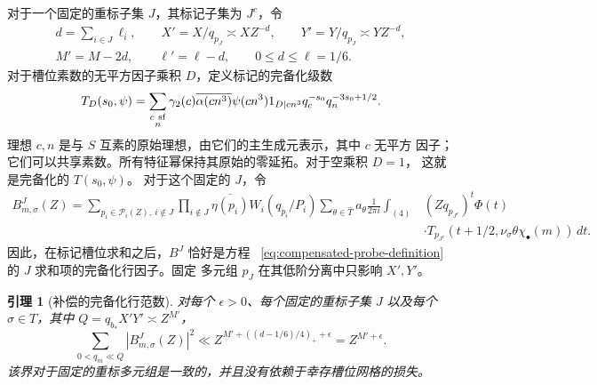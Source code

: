 \documentclass[11pt,a4paper]{article}
\numberwithin{equation}{section}
\numberwithin{figure}{section}
\newtheorem{lemma}[theorem]{引理}
\theoremstyle{definition}
\theoremstyle{remark}
\begin{document}
对于一个固定的重标子集 $J$，其标记子集为 $J^c$，令
\begin{equation}
 \begin{gathered}
 d=\sum_{i\in J}\ell_i,\qquad
 X'=X/q_{p_J}\asymp XZ^{-d},\qquad
 Y'=Y/q_{p_J}\asymp YZ^{-d},\\
 M'=M-2d,\qquad \ell'=\ell-d,\qquad 0\le d\le\ell=1/6.
 \end{gathered}
 \label{old-eq:5.2}
\end{equation}
对于槽位素数的无平方因子乘积 $D$，定义标记的完备化级数
\[
 T_D(s_0,\psi)=\sum_{\substack{c\ {\rm sf}\\n}}
 \gamma_2(c)\overline{\alpha(cn^3)}\psi(cn^3)
 1_{D\mid cn^3}q_c^{-s_0}q_n^{-3s_0+1/2}.
\]
理想 $c,n$ 是与 $S$ 互素的原始理想，由它们的主生成元表示，其中 $c$ 无平方
因子；它们可以共享素数。所有特征幂保持其原始的零延拓。对于空乘积 $D=1$，
这就是完备化的 $T(s_0,\psi)$。
对于这个固定的 $J$，令
\[
\begin{split}
 B^J_{m,\sigma}(Z)=
 \sum_{p_i\in\mathcal P_i(Z),\ i\notin J}
 \prod_{i\notin J}\overline{\eta(p_i)}W_i(q_{p_i}/P_i)
 \sum_{\theta\in\widehat T}a_\theta\frac1{2\pi i}
 \int_{(4)} &(Zq_{p_{J^c}})^t\Phi(t)\\
 &\cdot T_{p_{J^c}}(t+1/2,
             \nu_\sigma\theta\chi_\bullet(m))\,dt.
\end{split}
\]
因此，在标记槽位求和之后，$B^J$ 恰好是方程
~\eqref{eq:compensated-probe-definition} 的 $J$ 求和项的完备化行因子。固定
多元组 $p_J$ 在其低阶分离中只影响 $X',Y'$。

\begin{lemma}[补偿的完备化行范数]\label{lem:probe-row-norm}
对每个 $\epsilon>0$、每个固定的重标子集 $J$ 以及每个 $\sigma\in T$，其中
$Q=q_{b_*}X'Y'\asymp Z^{M'}$，
\begin{equation}
 \sum_{0<q_m\ll Q}|B^J_{m,\sigma}(Z)|^2
       \ll Z^{M'+((d-1/6)/4)_++\epsilon}
       =Z^{M'+\epsilon}.
 \label{old-eq:5.4}
\end{equation}
该界对于固定的重标多元组是一致的，并且没有依赖于幸存槽位网格的损失。
\end{lemma}
\end{document}
